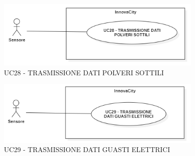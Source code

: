 
\begin{figure}[H]
    \centering
    \includegraphics[width=0.9\textwidth]{../Images/uc28.PNG}
    \caption{UC28 - TRASMISSIONE DATI POLVERI SOTTILI }
\end{figure}



\begin{figure}[H]
    \centering
    \includegraphics[width=0.9\textwidth]{../Images/uc29.PNG}
    \caption{UC29 - TRASMISSIONE DATI GUASTI ELETTRICI }
\end{figure}


\setcounter{rowcounter}{1}
